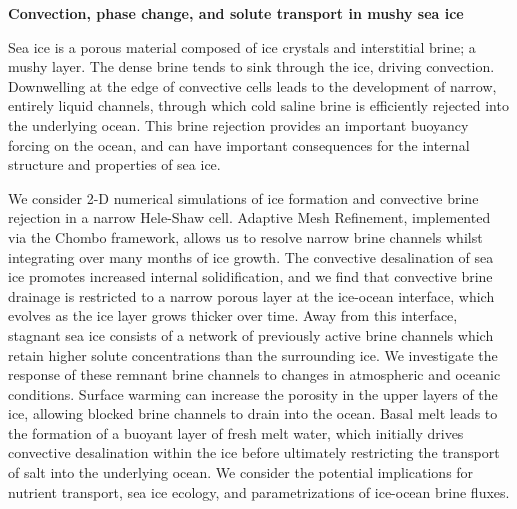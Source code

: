 \documentclass[]{article}
\begin{document}
\noindent \textbf{Convection, phase change, and solute transport in mushy sea ice}

\noindent Sea ice is a porous material composed of ice crystals and interstitial brine; a mushy layer. The dense brine tends to sink through the ice, driving convection. Downwelling at the edge of convective cells leads to the development of narrow, entirely liquid channels, through which cold saline brine is efficiently rejected into the underlying ocean. This brine rejection provides an important buoyancy forcing on the ocean, and can have important consequences
for the internal structure and properties of sea ice.

We consider 2-D numerical simulations of ice formation and convective brine rejection in a narrow Hele-Shaw cell. Adaptive Mesh Refinement, implemented via the Chombo framework, allows us to resolve narrow brine channels whilst integrating over many months of ice growth. The convective desalination of sea ice promotes increased internal solidification, and we find that convective brine drainage is restricted to a narrow porous layer at the ice-ocean interface, which evolves as the ice layer grows thicker over time. Away from this interface, stagnant sea ice consists of a network of previously active brine channels which retain higher solute concentrations than the surrounding ice. We investigate the response of these remnant brine channels to changes in atmospheric and oceanic conditions. Surface warming can increase the porosity in the upper layers of the ice, allowing blocked brine channels to drain into the ocean. Basal melt leads to the formation of a buoyant layer of fresh melt water, which initially drives convective desalination within the ice before ultimately restricting the transport of salt into the underlying ocean. We consider the potential implications for nutrient transport, sea ice ecology, and parametrizations of ice-ocean brine fluxes. 

\end{document}
